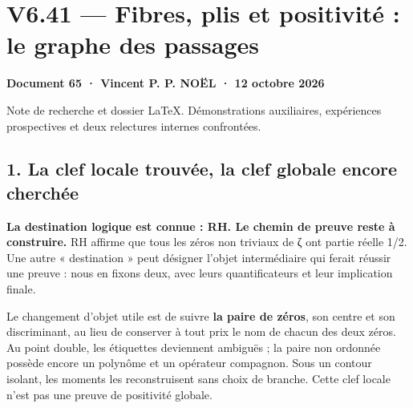 \documentclass[
  10pt,
  a4paper,
]{article}
\author{}
\date{}
\begin{document}
\hypertarget{v6.41-fibres-plis-et-positivituxe9-le-graphe-des-passages}{%
\section{V6.41 --- Fibres, plis et positivité : le graphe des
passages}\label{v6.41-fibres-plis-et-positivituxe9-le-graphe-des-passages}}

\textbf{Document 65 · Vincent P. P. NOËL · 12 octobre 2026}

Note de recherche et dossier LaTeX. Démonstrations auxiliaires,
expériences prospectives et deux relectures internes confrontées.

\hypertarget{la-clef-locale-trouvuxe9e-la-clef-globale-encore-cherchuxe9e}{%
\subsection{1. La clef locale trouvée, la clef globale encore
cherchée}\label{la-clef-locale-trouvuxe9e-la-clef-globale-encore-cherchuxe9e}}

\textbf{La destination logique est connue : RH. Le chemin de preuve
reste à construire.} RH affirme que tous les zéros non triviaux de ζ ont
partie réelle 1/2. Une autre « destination » peut désigner l'objet
intermédiaire qui ferait réussir une preuve : nous en fixons deux, avec
leurs quantificateurs et leur implication finale.

Le changement d'objet utile est de suivre \textbf{la paire de zéros},
son centre et son discriminant, au lieu de conserver à tout prix le nom
de chacun des deux zéros. Au point double, les étiquettes deviennent
ambiguës ; la paire non ordonnée possède encore un polynôme et un
opérateur compagnon. Sous un contour isolant, les moments les
reconstruisent sans choix de branche. Cette clef locale n'est pas une
preuve de positivité globale.
\end{document}
